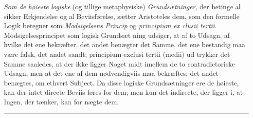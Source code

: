 \documentclass[12pt,a4paper]{book}
\newcommand{\divrule}{\begin{center}\rule{2cm}{0.4pt}\end{center}}
\begin{document}
\emph{Som de høieste logiske} (og tillige metaphysiske)
\emph{Grundsætninger}, der betinge al sikker Erkjendelse og al
Beviisførelse, sætter Aristoteles dem, som den formelle Logik
betegner som \emph{Modsigelsens Princip} og \emph{principium ex\-%
clusii tertii}. Modsigelsesprincipet som logisk Grundsæt\-%
ning udsiger, at af to Udsagn, af hvilke det ene bekræfter,
det andet benægter det Samme, det ene bestandig maa være
falsk, det andet sandt; principium exclusi tertii (medii) ud\-%
trykker det Samme saaledes, at der ikke ligger Noget midt
imellem de to contradictoriske Udsagn, men at det ene af
dem nødvendigviis maa bekræftes, det andet benægtes, om
ethvert Subject. Da disse logiske Grundsætninger ere de
høieste, kan der intet directe Beviis føres for dem; men kun
\setcounter{footnote}{0}
det indirecte, der ligger i, at Ingen, der tænker, kan for\-%
nægte dem.

\divrule
\end{document}
